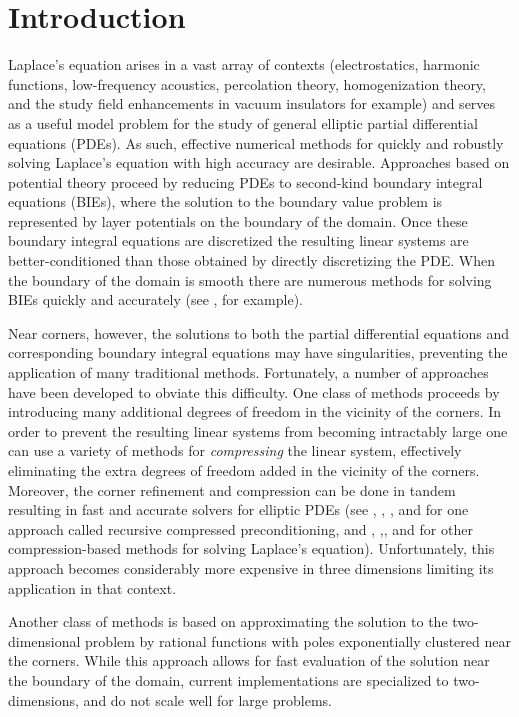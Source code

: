 \section{Introduction}
Laplace's equation arises in a vast array of contexts (electrostatics, harmonic functions, low-frequency acoustics, percolation theory, homogenization theory, and the study field enhancements in vacuum insulators for example) and serves as a useful model problem for the study of general elliptic partial differential equations (PDEs). As such, effective numerical methods for quickly and robustly solving Laplace's equation with high accuracy are desirable. Approaches based on potential theory proceed by reducing PDEs to second-kind boundary integral equations (BIEs), where the solution to the boundary value problem is represented by layer potentials on the boundary of the domain. Once these boundary integral equations are discretized the resulting linear systems are better-conditioned than those obtained by directly discretizing the PDE. When the boundary of the domain is smooth there are numerous methods for solving BIEs quickly and accurately (see \cite{hao}, for example). 

Near corners, however, the solutions to both the partial differential equations and corresponding boundary integral equations may have singularities, preventing the application of many traditional methods. Fortunately, a number of approaches have been developed to obviate this difficulty. One class of methods proceeds by introducing many additional degrees of freedom in the vicinity of the corners. In order to prevent the resulting linear systems from becoming intractably large one can use a variety of methods for {\it compressing} the linear system, effectively eliminating the extra degrees of freedom added in the vicinity of the corners. Moreover, the corner refinement and compression can be done in tandem resulting in fast and accurate solvers for elliptic PDEs (see \cite{helsing}, \cite{helsing2},  \cite{ojala}, \cite{helsjcp} and \cite{helsinv}  for  one approach called recursive compressed preconditioning, and  \cite{gillman}, \cite{bremer},\cite{bremer2}, and \cite{bremer3}  for other compression-based methods for solving Laplace's equation). Unfortunately, this approach becomes considerably more expensive in three dimensions limiting its application in that context.

 Another class of methods is based on approximating the solution to the two-dimensional problem by rational functions \cite{gopal2019solving} with poles exponentially clustered near the corners. While this approach allows for fast evaluation of the solution near the boundary of the domain, current implementations are specialized to two-dimensions, and do not scale well  for large problems.
 
